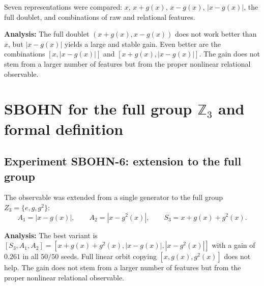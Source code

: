 \documentclass[11pt,a4paper]{report}
\begin{document}
Seven representations were compared: $x$, $x+g(x)$, $x-g(x)$, $|x-g(x)|$, the full
doublet, and combinations of raw and relational features.

\noindent{}


\noindent{}


\textbf{Analysis:} The full doublet $(x+g(x),x-g(x))$ does not work better than $x$, but
$|x-g(x)|$ yields a large and stable gain. Even better are the combinations
$[x,|x-g(x)|]$ and $[x+g(x),|x-g(x)|]$. The gain does not stem from a larger number of
features but from the proper nonlinear relational observable.


\section{SBOHN for the full group $\mathbb{Z}_3$ and formal definition}

\subsection{Experiment SBOHN-6: extension to the full group}

The observable was extended from a single generator to the full group
$Z_3=\{e,g,g^2\}$:
\[
A_1=|x-g(x)|,\qquad A_2=|x-g^2(x)|,\qquad S_3=x+g(x)+g^2(x).
\]

\noindent{}


\noindent{}


\textbf{Analysis:} The best variant is $[S_3,A_1,A_2]=[x+g(x)+g^2(x),|x-g(x)|,|x-g^2(x)|]$
with a gain of $0.261$ in all $50/50$ seeds. Full linear orbit copying
$[x,g(x),g^2(x)]$ does not help. The gain does not stem from a larger number of features but
from the proper nonlinear relational observable.
\end{document}
